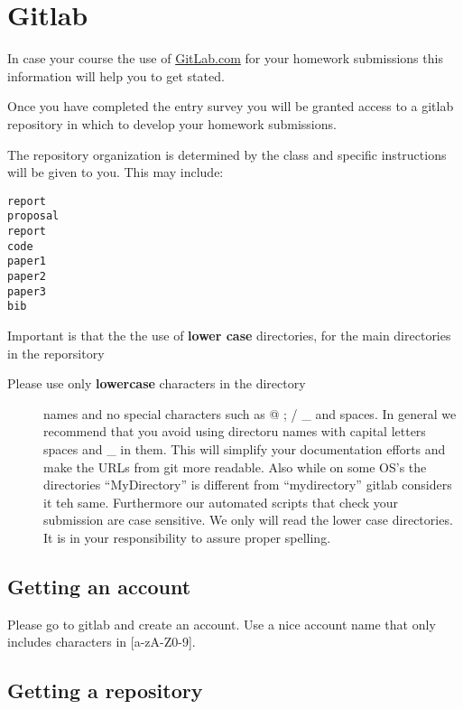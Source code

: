 \section{Gitlab}\label{gitlab}

In case your course the use of \href{https://gitlab.com/}{GitLab.com}
for your homework submissions this information will help you to get
stated.

Once you have completed the entry survey you will be granted access to a
gitlab repository in which to develop your homework submissions.

The repository organization is determined by the class and specific
instructions will be given to you. This may include:

\begin{verbatim}
report
proposal
report
code
paper1
paper2
paper3
bib
\end{verbatim}

Important is that the the use of \textbf{lower case} directories, for
the main directories in the reporsitory

\begin{description}
\item[Please use only \textbf{lowercase} characters in the directory]
names and no special characters such as @ ; / \_ and spaces. In general
we recommend that you avoid using directoru names with capital letters
spaces and \_ in them. This will simplify your documentation efforts and
make the URLs from git more readable. Also while on some OS's the
directories ``MyDirectory'' is different from ``mydirectory'' gitlab
considers it teh same. Furthermore our automated scripts that check your
submission are case sensitive. We only will read the lower case
directories. It is in your responsibility to assure proper spelling.
\end{description}

\subsection{Getting an account}\label{getting-an-account}

Please go to gitlab and create an account. Use a nice account name that
only includes characters in {[}a-zA-Z0-9{]}.



\subsection{Getting a repository}\label{getting-a-repository}

